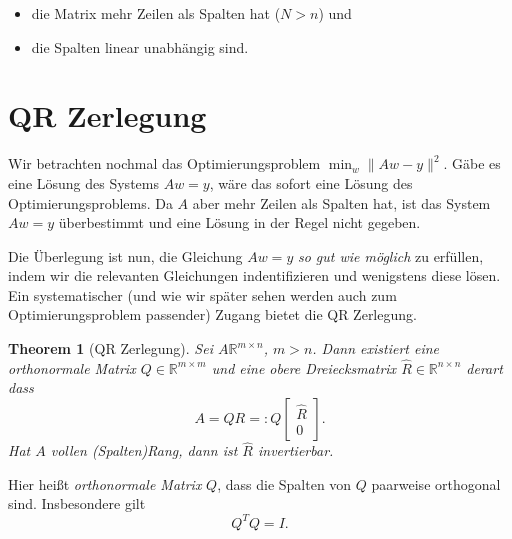 \documentclass[]{book}
\providecommand{\tightlist}{%
  \setlength{\itemsep}{0pt}\setlength{\parskip}{0pt}}
\newtheorem{theorem}{Theorem}[chapter]
\theoremstyle{definition}
\theoremstyle{definition}
\theoremstyle{definition}
\theoremstyle{definition}
\theoremstyle{remark}
\begin{document}
\begin{itemize}
\tightlist
\item
  die Matrix mehr Zeilen als Spalten hat (\(N>n\)) und
\item
  die Spalten linear unabhängig sind.
\end{itemize}

\hypertarget{qr-zerlegung}{%
\section{QR Zerlegung}\label{qr-zerlegung}}

Wir betrachten nochmal das Optimierungsproblem \(\min_{w} \| Aw - y \|^2\). Gäbe es eine Lösung des Systems \(Aw=y\), wäre das sofort eine Lösung des Optimierungsproblems. Da \(A\) aber mehr Zeilen als Spalten hat, ist das System \(Aw=y\) überbestimmt und eine Lösung in der Regel nicht gegeben.

Die Überlegung ist nun, die Gleichung \(Aw=y\) \emph{so gut wie möglich} zu erfüllen, indem wir die relevanten Gleichungen indentifizieren und wenigstens diese lösen. Ein systematischer (und wie wir später sehen werden auch zum Optimierungsproblem passender) Zugang bietet die QR Zerlegung.

\begin{theorem}[QR Zerlegung]
\protect\hypertarget{thm:qr}{}\label{thm:qr}Sei \(A\mathbb R^{m\times n}\), \(m>n\). Dann existiert eine orthonormale Matrix \(Q\in \mathbb R^{m\times m}\) und eine obere Dreiecksmatrix \(\hat R\in \mathbb R^{n\times n}\) derart dass
\begin{equation*}
A = QR =: Q 
\begin{bmatrix}
\hat R \\ 0
\end{bmatrix}.
\end{equation*}
Hat \(A\) vollen (Spalten)Rang, dann ist \(\hat R\) invertierbar.
\end{theorem}

Hier heißt \emph{orthonormale Matrix} \(Q\), dass die Spalten von \(Q\) paarweise orthogonal sind. Insbesondere gilt
\begin{equation*}
Q^T Q = I.
\end{equation*}
\end{document}
